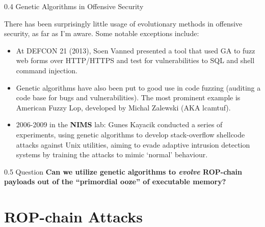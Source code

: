 \documentclass[9pt]{beamer}
\begin{document}
\begin{frame}{0.4 Genetic Algorithms in Offensive Security}

    There has been surprisingly little usage of evolutionary methods in offensive security, as far as I'm aware. Some notable exceptions include:
    
    \begin{itemize}
    
    \item At DEFCON 21 (2013), Soen Vanned presented a tool that used GA to fuzz web forms over HTTP/HTTPS and test for vulnerabilities to SQL and shell command injection.
    
    \item Genetic algorithms have also been put to good use in code fuzzing (auditing a code base for bugs and vulnerabilities). The most prominent example is American Fuzzy Lop, developed by Michal Zalewski (AKA lcamtuf). 
    
    
    \item 2006-2009 in the \textbf{NIMS} lab: Gunes Kayacik conducted a series of experiments, using genetic algorithms to develop stack-overflow shellcode attacks against Unix utilities, aiming to evade adaptive intrusion detection systems by training the attacks to mimic `normal' behaviour.
    
    \end{itemize}

\end{frame}

\begin{frame}{0.5 Question}%
 \huge \textbf{Can we utilize genetic algorithms to \emph{evolve} ROP-chain payloads out of the ``primordial ooze'' of executable memory?}
 
\end{frame}

\section{ROP-chain Attacks}


\end{document}
